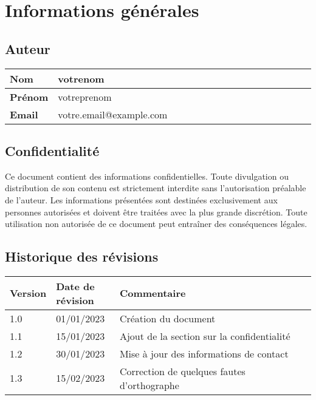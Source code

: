 \section{Informations générales}

\subsection{Auteur}
\begin{center}
    \begin{tabular}{|p{0.1\linewidth}|p{0.94\linewidth}|}
        \hline
        \textbf{Nom} & votrenom\\ \hline
        \textbf{Prénom}  & votreprenom \\ \hline
        \textbf{Email} & votre.email@example.com \\ \hline
    \end{tabular}
\end{center}

\subsection{Confidentialité}

Ce document contient des informations confidentielles. Toute divulgation ou distribution de son contenu est strictement interdite sans l'autorisation préalable de l'auteur. Les informations présentées sont destinées exclusivement aux personnes autorisées et doivent être traitées avec la plus grande discrétion. Toute utilisation non autorisée de ce document peut entraîner des conséquences légales.

\subsection{Historique des révisions}
\begin{center}
    \begin{tabular}{|p{0.1\linewidth}|p{0.21\linewidth}|p{0.7\linewidth}|}
        \hline
        \textbf{Version} & \textbf{Date de révision} & \textbf{Commentaire} \\ \hline
        1.0 & 01/01/2023 & Création du document \\ \hline
        1.1 & 15/01/2023 & Ajout de la section sur la confidentialité \\ \hline
        1.2 & 30/01/2023 & Mise à jour des informations de contact \\ \hline
        1.3 & 15/02/2023 & Correction de quelques fautes d'orthographe \\ \hline
    \end{tabular}
\end{center}